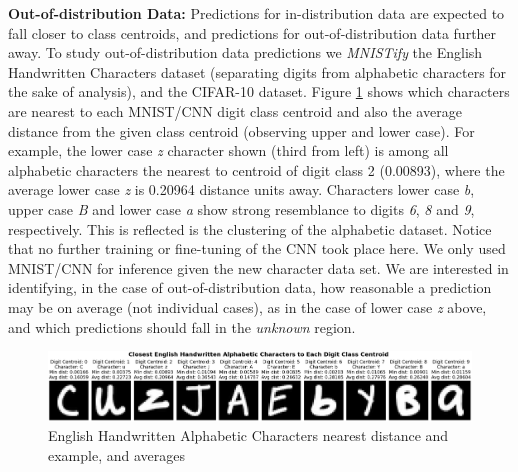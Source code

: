 \textbf{Out-of-distribution Data:} Predictions for in-distribution data are expected to fall closer to class centroids, and predictions for out-of-distribution data further away. To study out-of-distribution data predictions we \textit{MNISTify} the English Handwritten Characters dataset \cite{deCampos09} (separating digits from alphabetic characters for the sake of analysis), and the CIFAR-10 dataset. %
Figure \ref{fig:closest_alphabetic_characters_to_each_digit} shows which characters are nearest to each MNIST/CNN digit class centroid and also the average distance from the given class centroid (observing upper and lower case). For example, the lower case \textit{z} character shown (third from left) is among all alphabetic characters the nearest to centroid of digit class 2 (0.00893), where the average lower case \textit{z} is 0.20964 distance units away. Characters lower case \textit{b}, upper case \textit{B} and lower case \textit{a} show strong resemblance to digits \textit{6}, \textit{8} and \textit{9}, respectively. This is reflected is the clustering of the alphabetic dataset. Notice that no further training or fine-tuning of the CNN took place here. We only used MNIST/CNN for inference given the new character data set. We are interested in identifying, in the case of out-of-distribution data, how reasonable a prediction may be on average (not individual cases), as in the case of lower case \textit{z} above, and which predictions should fall in the \textit{unknown} region. 

\begin{figure}[ht!]
    \centering
    \includegraphics[width=0.99\columnwidth]{Figures/Results/closest_alphabetic_characters_to_each_digit.png}
    \caption{English Handwritten Alphabetic Characters nearest distance and example, and averages}
\label{fig:closest_alphabetic_characters_to_each_digit}
\end{figure}



